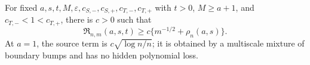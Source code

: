 For fixed \(a,s,t,M,\varepsilon,c_{S,-},c_{S,+},c_{T,-},c_{T,+}\) with \(t>0\), \(M\ge a+1\), and \(c_{T,-}<1<c_{T,+}\), there is \(c>0\) such that \[\mathfrak R_{n,m}(a,s,t)\ge c\{m^{-1/2}+\rho_n(a,s)\}.\] At \(a=1\), the source term is \(c\sqrt{\log n/n}\); it is obtained by a multiscale mixture of boundary bumps and has no hidden polynomial loss.